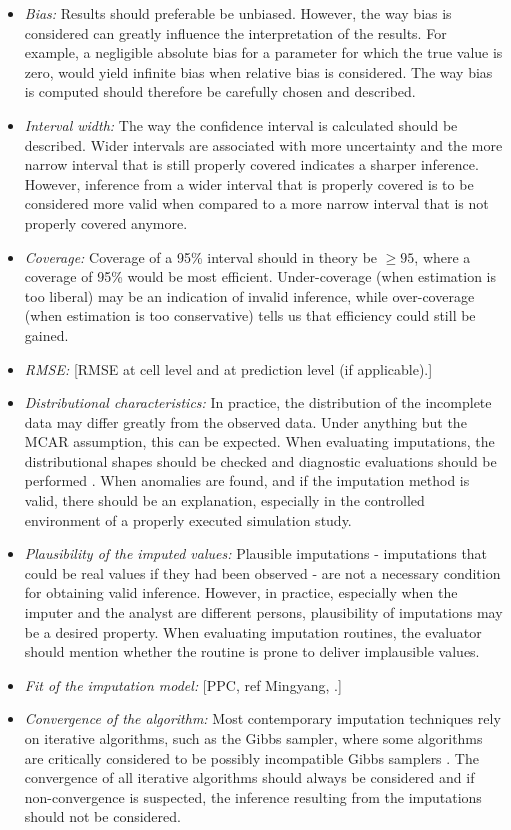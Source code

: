 \documentclass[bimj,fleqn]{w-art}
\theoremstyle{plain}
\theoremstyle{definition}
\begin{document}
\begin{itemize}
  \item \emph{Bias:} Results should preferable be unbiased. However, the way bias is considered can greatly influence the interpretation of the results. For example, a negligible absolute bias for a parameter for which the true value is zero, would yield infinite bias when relative bias is considered. The way bias is computed should therefore be carefully chosen and described. 
  \item \emph{Interval width:} The way the confidence interval is calculated should be described. Wider intervals are associated with more uncertainty and the more narrow interval that is still properly covered indicates a sharper inference. However, inference from a wider interval that is properly covered is to be considered more valid when compared to a more narrow interval that is not properly covered anymore. 
  \item \emph{Coverage:} Coverage of a 95\% interval should in theory be $\geq 95$, where a coverage of 95\% would be most efficient. Under-coverage (when estimation is too liberal) may be an indication of invalid inference, while over-coverage (when estimation is too conservative) tells us that efficiency could still be gained. 
  \item \emph{RMSE:} [RMSE at cell level and at prediction level (if applicable).]
  \item \emph{Distributional characteristics:} In practice, the distribution of the incomplete data may differ greatly from the observed data. Under anything but the MCAR assumption, this can be expected. When evaluating imputations, the distributional shapes should be checked and diagnostic evaluations should be performed \citep[see][for an detailed overview of diagnostic evaluation for multivariate imputations]{abayomi2008diagnostics}. When anomalies are found, and if the imputation method is valid, there should be an explanation, especially in the controlled environment of a properly executed simulation study. 
  \item \emph{Plausibility of the imputed values:} Plausible imputations - imputations that could be real values if they had been observed - are not a necessary condition for obtaining valid inference. However, in practice, especially when the imputer and the analyst are different persons, plausibility of imputations may be a desired property. When evaluating imputation routines, the evaluator should mention whether the routine is prone to deliver implausible values. 
  \item \emph{Fit of the imputation model:} [PPC, ref Mingyang, \citep{nguy17, zhao22}.]
  \item \emph{Convergence of the algorithm:} Most contemporary imputation techniques rely on iterative algorithms, such as the Gibbs sampler, where some algorithms are critically considered to be possibly incompatible Gibbs samplers \citep[PIGS,][]{li2012imputing}. The convergence of all iterative algorithms should always be considered and if non-convergence is suspected, the inference resulting from the imputations should not be considered.  
  \end{itemize}
\end{document}

